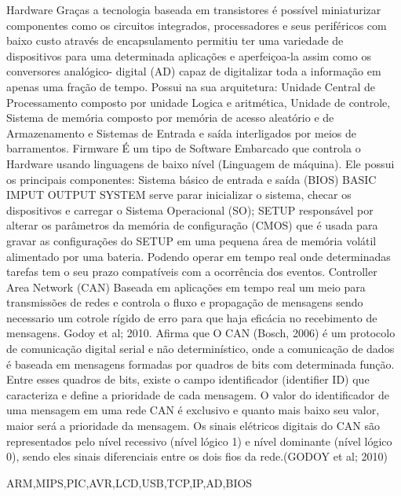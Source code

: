 Hardware 
Graças a tecnologia baseada em transistores é possível miniaturizar componentes como os circuitos integrados, processadores e seus periféricos com baixo custo através de encapsulamento permitiu ter uma variedade de dispositivos para uma determinada aplicações e aperfeiçoa-la assim como os conversores analógico- digital (AD) capaz de digitalizar toda a informação em apenas uma fração de tempo.  Possui na sua arquitetura: Unidade Central de Processamento composto por unidade Logica e aritmética, Unidade de controle, Sistema de memória composto por memória de acesso aleatório e de Armazenamento e Sistemas de Entrada e saída interligados por meios de barramentos.
Firmware
É um tipo de Software Embarcado que controla o Hardware usando linguagens de baixo nível (Linguagem de máquina). Ele possui os principais componentes: Sistema básico de entrada e saída (BIOS) BASIC IMPUT OUTPUT SYSTEM serve parar inicializar o sistema, checar os dispositivos e carregar o Sistema Operacional (SO); SETUP responsável por alterar os parâmetros da memória de configuração (CMOS) que é usada para gravar as configurações do SETUP em uma pequena área de memória volátil alimentado por uma bateria. Podendo operar em tempo real onde determinadas tarefas tem o seu prazo compatíveis com a ocorrência dos eventos.
Controller Area Network (CAN)
Baseada em aplicações em tempo real um meio para transmissões de redes e controla o fluxo e propagação de mensagens sendo necessario um cotrole rígido de erro para que haja eficácia no recebimento de mensagens.
Godoy et al; 2010. Afirma que O CAN (Bosch, 2006) é um protocolo de comunicação digital serial e não determinístico, onde a comunicação de dados é baseada em mensagens formadas por quadros de bits com determinada função. Entre esses quadros de bits, existe o campo identificador (identifier ID) que caracteriza e define a prioridade de cada mensagem. O valor do identificador de uma mensagem em uma rede CAN é exclusivo e quanto mais baixo seu valor, maior será a prioridade da mensagem. Os sinais elétricos digitais do CAN são representados pelo nível recessivo (nível lógico 1) e nível dominante (nível lógico 0), sendo eles sinais diferenciais entre os dois fios da rede.(GODOY et al; 2010)



\acrlong{ARM},\acrlong{MIPS},\acrlong{PIC},\acrlong{AVR},\acrlong{LCD},\acrlong{USB},\acrlong{TCP},\acrlong{IP},\acrlong{AD},\acrlong{BIOS}


